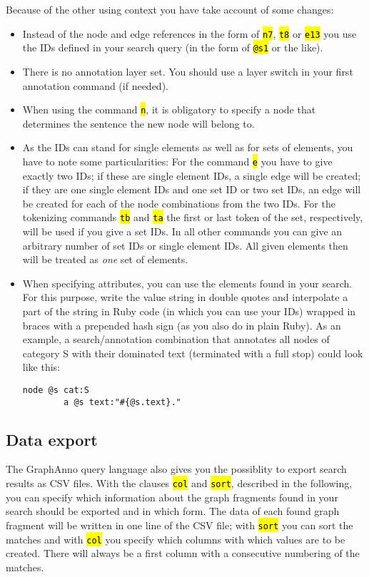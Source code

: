 \documentclass[12pt]{scrartcl}
\newcommand{\code}[1]{\hl{\texttt{#1}}}
\begin{document}
Because of the other using context you have take account of some changes:
\begin{itemize}
	\item Instead of the node and edge references in the form of \code{n7}, \code{t8} or \code{e13} you use the IDs defined in your search query (in the form of \code{@s1} or the like).
	\item There is no annotation layer set. You should use a layer switch in your first annotation command (if needed).
	\item When using the command \code{n}, it is obligatory to specify a node that determines the sentence the new node will belong to.
	\item As the IDs can stand for single elements as well as for sets of elements, you have to note some particularities: For the command \code{e} you have to give exactly two IDs; if these are single element IDs, a single edge will be created; if they are one single element IDs and one set ID or two set IDs, an edge will be created for each of the node combinations from the two IDs. For the tokenizing commands \code{tb} and \code{ta} the first or last token of the set, respectively, will be used if you give a set IDs. In all other commands you can give an arbitrary number of set IDs or single element IDs. All given elements then will be treated as \textit{one} set of elements.
	\item When specifying attributes, you can use the elements found in your search. For this purpose, write the value string in double quotes and interpolate a part of the string in Ruby code (in which you can use your IDs) wrapped in braces with a prepended hash sign (as you also do in plain Ruby). As an example, a search/annotation combination that annotates all nodes of category S with their dominated text (terminated with a full stop) could look like this:
	\begin{lstlisting}[gobble=8]
		node @s cat:S
		a @s text:"#{@s.text}."
	\end{lstlisting}
\end{itemize}


\subsection{Data export}

The GraphAnno query language also gives you the possiblity to export search results as CSV files.
With the clauses \code{col} and \code{sort}, described in the following, you can specify which information about the graph fragments found in your search should be exported and in which form.
The data of each found graph fragment will be written in one line of the CSV file; with \code{sort} you can sort the matches and with \code{col} you specify which columns with which values are to be created.
There will always be a first column with a consecutive numbering of the matches.
\end{document}
